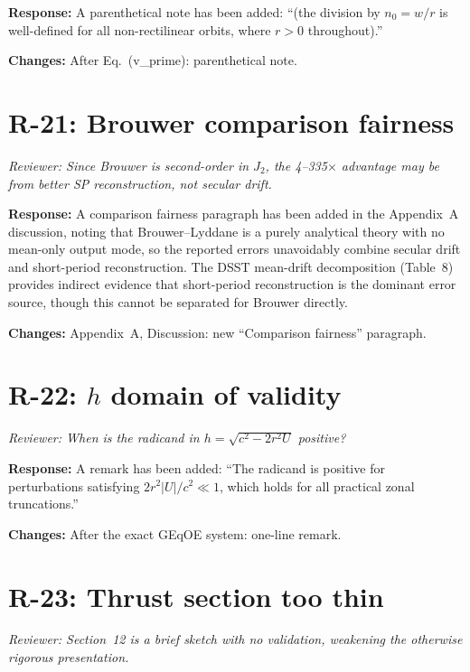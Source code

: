 \documentclass[11pt]{article}
\newcommand{\rev}[1]{\textcolor{revcolor}{\emph{#1}}}
\begin{document}
\textbf{Response:} A parenthetical note has been added: ``(the division
by $n_0 = w/r$ is well-defined for all non-rectilinear orbits, where
$r > 0$ throughout).''

\textbf{Changes:} After Eq.~(v\_prime): parenthetical note.

\section*{R-21: Brouwer comparison fairness}

\rev{Reviewer: Since Brouwer is second-order in $J_2$, the 4--335$\times$
advantage may be from better SP reconstruction, not secular drift.}

\textbf{Response:} A comparison fairness paragraph has been added in the
Appendix~A discussion, noting that Brouwer--Lyddane is a purely analytical
theory with no mean-only output mode, so the reported errors unavoidably
combine secular drift and short-period reconstruction. The DSST mean-drift
decomposition (Table~8) provides indirect evidence that short-period
reconstruction is the dominant error source, though this cannot be
separated for Brouwer directly.

\textbf{Changes:} Appendix~A, Discussion: new ``Comparison fairness''
paragraph.

\section*{R-22: $h$ domain of validity}

\rev{Reviewer: When is the radicand in $h = \sqrt{c^2 - 2r^2 U}$ positive?}

\textbf{Response:} A remark has been added: ``The radicand is positive for
perturbations satisfying $2r^2|U|/c^2 \ll 1$, which holds for all practical
zonal truncations.''

\textbf{Changes:} After the exact GEqOE system: one-line remark.

\section*{R-23: Thrust section too thin}

\rev{Reviewer: Section~12 is a brief sketch with no validation, weakening
the otherwise rigorous presentation.}
\end{document}
